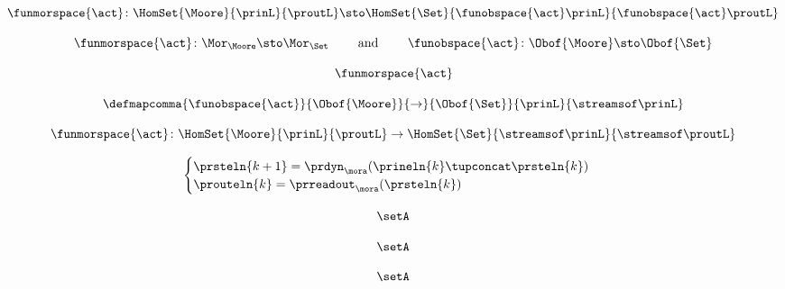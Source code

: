 \begin{forslides}
    \begin{equation}
        \label{eq:slides-processes-39}
        \funmorspace{\act} \colon  \HomSet{\Moore}{\prinL}{\proutL} \sto \HomSet{\Set}{ \funobspace{\act}\prinL}{\funobspace{\act}\proutL}
    \end{equation}
    
    \begin{equation}
        \label{eq:slides-processes-40}
        \funmorspace{\act} \colon \Mor_\Moore \sto \Mor_\Set \qquad \text{ and } \qquad \funobspace{\act} \colon \Obof{\Moore} \sto \Obof{\Set}
    \end{equation}

    \begin{equation}
        \label{eq:slides-processes-41}
        \funmorspace{\act}
    \end{equation}

    \begin{equation}
        \label{eq:slides-processes-42}
        \defmapcomma{\funobspace{\act}}
        {\Obof{\Moore}}
        {\to}
        {\Obof{\Set}}
        {\prinL}
        {\streamsof\prinL}
    \end{equation}

    \begin{equation}
        \label{eq:slides-processes-43}
         \funmorspace{\act} \colon  \HomSet{\Moore}{\prinL}{\proutL} \to \HomSet{\Set}{\streamsof\prinL }{\streamsof\proutL}
    \end{equation}

    \begin{equation}
        \label{eq:slides-processes-44}
        \begin{cases}
            \prsteln{k+1} = \prdyn_\mora(\prineln{k} \tupconcat \prsteln{k}) \\
            \prouteln{k}   = \prreadout_\mora(\prsteln{k})
        \end{cases}
    \end{equation}

    \begin{equation}
        \label{eq:slides-processes-45}
        \setA
    \end{equation}

    \begin{equation}
        \label{eq:slides-processes-46}
        \setA
    \end{equation}

    \begin{equation}
        \label{eq:slides-processes-47}
        \setA
    \end{equation}


\end{forslides}
